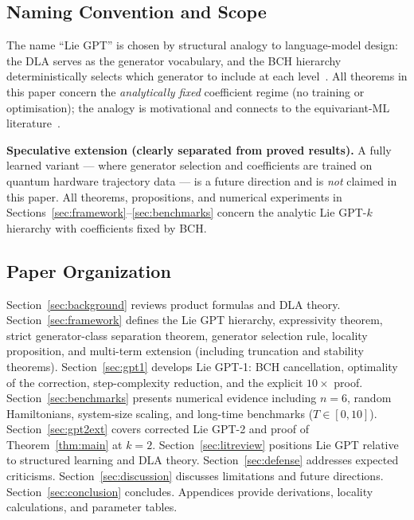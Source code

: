 \documentclass[aps,prxquantum,twocolumn,nofootinbib]{revtex4-2}
\begin{document}
\subsection{Naming Convention and Scope}

The name ``Lie GPT'' is chosen by structural analogy to language-model
design: the DLA serves as the generator vocabulary, and the BCH
hierarchy deterministically selects which generator to include at each
level~\cite{bronstein2022iclr,nguyen2022,icml_ragone2024}.
All theorems in this paper concern the \emph{analytically fixed}
coefficient regime (no training or optimisation); the analogy is
motivational and connects to the equivariant-ML
literature~\cite{icml_larocca2023,icml_schatzki2024,larocca2023}.

\textbf{Speculative extension (clearly separated from proved results).}
A fully learned variant --- where generator selection and
coefficients are trained on quantum hardware trajectory data ---
is a future direction and is \emph{not} claimed in this paper.
All theorems, propositions, and numerical experiments in
Sections~\ref{sec:framework}--\ref{sec:benchmarks} concern the
analytic Lie GPT-$k$ hierarchy with coefficients fixed by BCH.

\subsection{Paper Organization}

Section~\ref{sec:background} reviews product formulas and DLA theory.
Section~\ref{sec:framework} defines the Lie GPT hierarchy,
expressivity theorem, strict generator-class separation theorem,
generator selection rule, locality proposition, and multi-term
extension (including truncation and stability theorems).
Section~\ref{sec:gpt1} develops Lie GPT-1: BCH cancellation,
optimality of the correction, step-complexity reduction,
and the explicit $10\times$ proof.
Section~\ref{sec:benchmarks} presents numerical evidence including
$n=6$, random Hamiltonians, system-size scaling, and long-time
benchmarks ($T\in[0,10]$).
Section~\ref{sec:gpt2ext} covers corrected Lie GPT-2 and proof of
Theorem~\ref{thm:main} at $k=2$.
Section~\ref{sec:litreview} positions Lie GPT relative to structured
learning and DLA theory.
Section~\ref{sec:defense} addresses expected criticisms.
Section~\ref{sec:discussion} discusses limitations and future
directions.
Section~\ref{sec:conclusion} concludes.
Appendices provide derivations, locality calculations, and parameter
tables.
\end{document}
